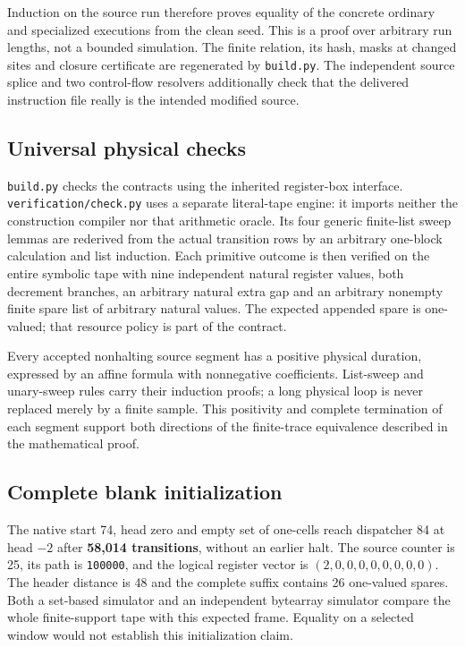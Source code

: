 \documentclass[11pt,letterpaper]{article}
\newcommand{\file}[1]{\texttt{\nolinkurl{#1}}}
\begin{document}
Induction on the source run therefore proves equality of the concrete
ordinary and specialized executions from the clean seed. This is a proof
over arbitrary run lengths, not a bounded simulation. The finite relation,
its hash, masks at changed sites and closure certificate are regenerated
by \file{build.py}. The independent source splice and two control-flow
resolvers additionally check that the delivered instruction file really
is the intended modified source.

\subsection{Universal physical checks}

\file{build.py} checks the contracts using the inherited register-box
interface. \file{verification/check.py} uses a separate literal-tape
engine: it imports neither the construction compiler nor that arithmetic
oracle. Its four generic finite-list sweep lemmas are rederived from the
actual transition rows by an arbitrary one-block calculation and list
induction. Each primitive outcome is then verified on the entire symbolic
tape with nine independent natural register values, both decrement
branches, an arbitrary natural extra gap and an arbitrary nonempty finite
spare list of arbitrary natural values. The expected appended spare is
one-valued; that resource policy is part of the contract.



Every accepted nonhalting source segment has a positive physical duration,
expressed by an affine formula with nonnegative coefficients. List-sweep
and unary-sweep rules carry their induction proofs; a long physical loop
is never replaced merely by a finite sample. This positivity and complete
termination of each segment support both directions of the finite-trace
equivalence described in the mathematical proof.

\subsection{Complete blank initialization}

The native start 74, head zero and empty set of one-cells reach dispatcher
84 at head $-2$ after \textbf{58,014 transitions}, without an earlier halt.
The source counter is 25, its path is \texttt{100000}, and the logical
register vector is $(2,0,0,0,0,0,0,0,0)$. The header distance is 48 and
the complete suffix contains 26 one-valued spares. Both a set-based
simulator and an independent bytearray simulator compare the whole
finite-support tape with this expected frame. Equality on a selected
window would not establish this initialization claim.
\end{document}

